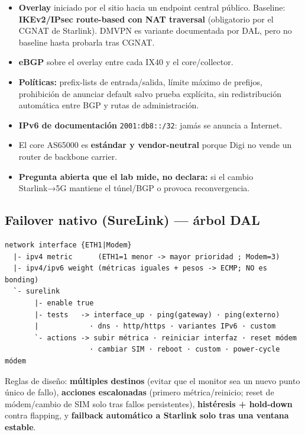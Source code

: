 \documentclass[11pt,a4paper]{article}
\begin{document}
\begin{itemize}
  \item \textbf{Overlay} iniciado por el sitio hacia un endpoint central público.
        Baseline: \textbf{IKEv2/IPsec route-based con NAT traversal}
        (obligatorio por el CGNAT de Starlink). DMVPN es variante documentada por DAL,
        pero no baseline hasta probarla tras CGNAT.
  \item \textbf{eBGP} sobre el overlay entre cada IX40 y el core/collector.
  \item \textbf{Políticas:} prefix-lists de entrada/salida, límite máximo de prefijos,
        prohibición de anunciar default salvo prueba explícita, sin redistribución automática
        entre BGP y rutas de administración.
  \item \textbf{IPv6 de documentación} \texttt{2001:db8::/32}: jamás se anuncia a Internet.
  \item El core AS65000 es \textbf{estándar y vendor-neutral} porque Digi no vende un router
        de backbone carrier.
  \item \textbf{Pregunta abierta que el lab mide, no declara:} si el cambio Starlink→5G
        mantiene el túnel/BGP o provoca reconvergencia.
\end{itemize}

\subsection{Failover nativo (SureLink) — árbol DAL}

\begin{diagbox}
\begin{Verbatim}[fontsize=\footnotesize]
network interface {ETH1|Modem}
  |- ipv4 metric      (ETH1=1 menor -> mayor prioridad ; Modem=3)
  |- ipv4/ipv6 weight (métricas iguales + pesos -> ECMP; NO es bonding)
  `- surelink
       |- enable true
       |- tests   -> interface_up · ping(gateway) · ping(externo)
       |            · dns · http/https · variantes IPv6 · custom
       `- actions -> subir métrica · reiniciar interfaz · reset módem
                    · cambiar SIM · reboot · custom · power-cycle módem
\end{Verbatim}
\end{diagbox}

Reglas de diseño:
\textbf{múltiples destinos} (evitar que el monitor sea un nuevo punto único de fallo),
\textbf{acciones escalonadas} (primero métrica/reinicio; reset de módem/cambio de SIM solo tras
fallos persistentes), \textbf{histéresis + hold-down} contra flapping, y
\textbf{failback automático a Starlink solo tras una ventana estable}.
\end{document}
